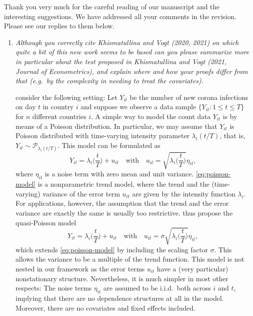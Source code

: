 \documentclass[a4paper,12pt]{article}
\begin{document}
Thank you very much for the careful reading of our manuscript and the interesting suggestions. We have addressed all your comments in the revision. Please see our replies to them below.
\begin{enumerate}[label=\arabic*.,leftmargin=0.6cm]

  
\item \textit{Although you correctly cite Khismatullina and Vogt (2020, 2021) on which quite a bit of this new work seems to be based can you please summarize more in particular about the test proposed in Khismatullina and Vogt (2021, Journal of Econometrics), and explain where and how your proofs differ from that (e.g.\ by the complexity in needing to treat the covariates).}

\cite{KhismatullinaVogt2021} consider the following setting: Let $Y_{it}$ be the number of new corona infections on day $t$ in country $i$ and suppose we observe a data sample $\{Y_{it}: 1 \le t \le T \}$ for $n$ different countries $i$. A simple way to model the count data $Y_{it}$ is by means of a Poisson distribution. In particular, we may assume that $Y_{it}$ is Poisson distributed with time-varying intensity parameter $\lambda_i(t/T)$, that is, $Y_{it} \sim \mathcal{P}_{\lambda_i(t/T)}$. This model can be formulated as
\begin{equation}\label{eq:poisson-model}
Y_{it} = \lambda_i\Big(\frac{t}{T}\Big) + u_{it} \quad \text{with} \quad u_{it} = \sqrt{ \lambda_i\Big(\frac{t}{T}\Big) } \eta_{it}, 
\end{equation}
where $\eta_{it}$ is a noise term with zero mean and unit variance. \eqref{eq:poisson-model} is a nonparametric trend model, where the trend and the (time-varying) variance of the error term $u_{it}$ are given by the intensity function $\lambda_i$. For applications, however, the assumption that the trend and the error variance are exactly the same is usually too restrictive. \cite{KhismatullinaVogt2021} thus propose the quasi-Poisson model 
\begin{equation}\label{eq:quasi-poisson-model}
Y_{it} = \lambda_i\Big(\frac{t}{T}\Big) + u_{it} \quad \text{with} \quad u_{it} = \sigma \sqrt{ \lambda_i\Big(\frac{t}{T}\Big) } \eta_{it}, 
\end{equation}
which extends \eqref{eq:poisson-model} by including the scaling factor $\sigma$. This allows the variance to be a multiple of the trend function. This model is not nested in our framework as the error terms $u_{it}$ have a (very particular) nonstationary structure. Nevertheless, it is much simpler in most other respects: The noise terms $\eta_{it}$ are assumed to be i.i.d.\ both across $i$ and $t$, implying that there are no dependence structures at all in the model. Moreover, there are no covariates and fixed effects included. \\

\end{enumerate}
\end{document}
